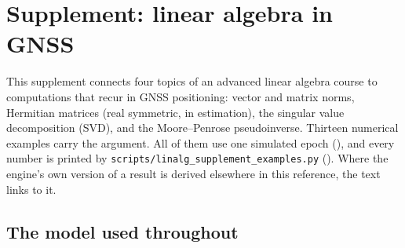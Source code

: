 \documentclass[main.tex]{subfiles}
\begin{document}

\section{Supplement: linear algebra in GNSS}\label{sec:linalg}

This supplement connects four topics of an advanced linear algebra course to
computations that recur in GNSS positioning: vector and matrix norms,
Hermitian matrices (real symmetric, in estimation), the singular value
decomposition (SVD), and the Moore--Penrose pseudoinverse.  Thirteen
numerical examples carry the argument.  All of them use one simulated epoch
(), and every number is printed by
\texttt{scripts/linalg\_supplement\_examples.py} ().
Where the engine's own version of a result is derived elsewhere in this
reference, the text links to it.

\subsection{The model used throughout}\label{sec:la-model}
\end{document}
